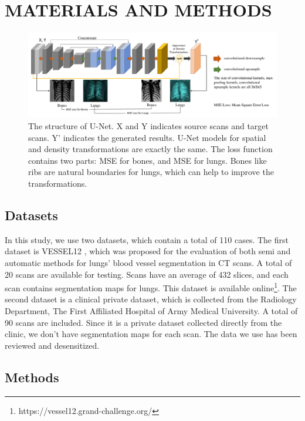 \documentclass{article}
\begin{document}
\section{MATERIALS AND METHODS}
\label{sec:materials}
\begin{figure}[htbp]
    \centerline{\includegraphics[width=180mm]{unet.pdf}}
    \vspace{-0.3cm}
    \caption{The structure of U-Net. X and Y indicates source scans and target scans. Y' indicates the generated results. U-Net models for spatial and density transformations are exactly the same. The loss function contains two parts: MSE for bones, and MSE for lungs. Bones like ribs are natural boundaries for lungs, which can help to improve the transformations.
    }
    \vspace{-0.3cm}
    \label{unet}
    \end{figure}
\subsection{Datasets}
\label{dataset}
In this study, we use two datasets, which contain a total of 110 cases.
The first dataset is VESSEL12 \cite{rudyanto2014comparing}, which was proposed for the evaluation of both semi and automatic methods for lungs’ blood vessel segmentation in CT scans. A total of 20 scans are available for testing. Scans have an average of 432 slices, and each scan contains segmentation maps for lungs. This dataset is available online\footnote{https://vessel12.grand-challenge.org/}.
The second dataset is a clinical private dataset, which is collected from the Radiology Department, The First Affiliated Hospital of Army Medical University. A total of 90 scans are included. Since it is a private dataset collected directly from the clinic, we don't have segmentation maps for each scan. The data we use has been reviewed and desensitized.

\subsection{Methods}
\label{methods}
\end{document}
